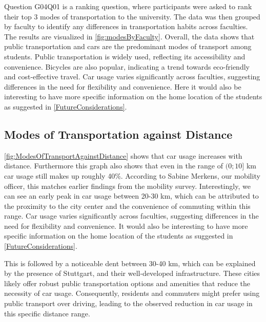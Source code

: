 \begin{multicols}{2}
    
    \columnbreak
    Question G04Q01 is a ranking question, where participants were asked to rank their top 3 modes of transportation to the university. The data was then grouped by faculty to identify any differences in transportation habits across faculties. The results are visualized in \ref{fig:modesByFaculty}.
    Overall, the data shows that public transportation and cars are the predominant modes of transport among students. Public transportation is widely used, reflecting its accessibility and convenience. Bicycles are also popular, indicating a trend towards eco-friendly and cost-effective travel. Car usage varies significantly across faculties, suggesting differences in the need for flexibility and convenience. Here it would also be interesting to have more specific information on the home location of the students as suggested in \ref{FutureConsiderations}.
\end{multicols}

\subsection{Modes of Transportation against Distance}

\begin{multicols}{2}
    
    \columnbreak
    \ref{fig:ModesOfTransportAgainstDistance} shows that car usage increases with distance. Furthermore this graph also shows that even in the range of $(0;10]$ km car usage still makes up roughly 40\%. According to Sabine Merkens, our mobility officer, this matches earlier findings from the mobility survey. 
    Interestingly, we can see an early peak in car usage between 20-30 km, which can be attributed to the proximity to the city center and the convenience of commuting within this range.
    Car usage varies significantly across faculties, suggesting differences in the need for flexibility and convenience. It would also be interesting to have more specific information on the home location of the students as suggested in \ref{FutureConsiderations}.
\end{multicols}


This is followed by a noticeable dent between 30-40 km, which can be explained by the presence of Stuttgart, and their well-developed infrastructure. These cities likely offer robust public transportation options and amenities that reduce the necessity of car usage. Consequently, residents and commuters might prefer using public transport over driving, leading to the observed reduction in car usage in this specific distance range.

